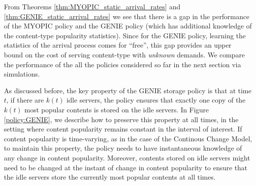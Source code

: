 \documentclass[10pt, conference, letterpaper]{IEEEtran}
\def \idle {k}
\begin{document}
From Theorems \ref{thm:MYOPIC_static_arrival_rates} and
\ref{thm:GENIE_static_arrival_rates} we see that there is a gap in the
performance of the MYOPIC policy and the GENIE policy (which has
additional knowledge of the content-type popularity statistics). Since
for the GENIE policy, learning the statistics of the arrival process
comes for ``free'', this gap provides an upper bound on the cost of
serving content-type with \emph{unknown} demands. We compare the
performance of the all the policies considered so far in the next
section via simulations.



As discussed before, the key property of the GENIE storage policy is that at time $t$, if there are $\idle(t)$ idle servers, the policy ensures that exactly one copy of the $\idle(t)$ most popular contents is stored on the idle servers. In Figure \ref{policy:GENIE}, we describe how to preserve this property at all times, in the setting where content popularity remains constant in the interval of interest.  If content popularity is time-varying, as in the case of the Continous Change Model, to maintain this property, the policy needs to have instantaneous knowledge of any change in content popularity. Moreover, contents stored on idle servers might need to be changed at the instant of change in content popularity to ensure that the idle servers store the currently most popular contents at all times.
\end{document}
